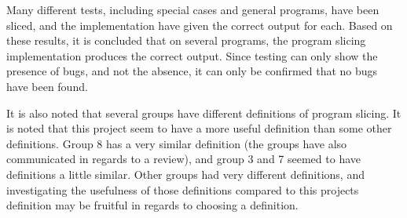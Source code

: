 Many different tests, including special cases and general programs,
have been sliced, and the implementation have given the correct output
for each. Based on these results, it is concluded that on several
programs, the program slicing implementation produces the correct output.
Since testing can only show the presence of bugs, and not the absence,
it can only be confirmed that no bugs have been found.

It is also noted that several groups have different definitions of program slicing.
It is noted that this project seem to have a more useful definition than some
other definitions.
Group 8 has a very similar definition (the groups have also communicated in regards
to a review), and group 3 and 7 seemed to have definitions a little similar.
Other groups had very different definitions, and investigating the usefulness of
those definitions compared to this projects definition may be fruitful in regards
to choosing a definition.

